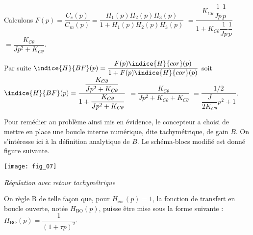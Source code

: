\begin{multicols}{2}

\ifprof
\begin{corrige}
Calculons $F(p) =\dfrac{C_e(p)}{C_m(p)} = \dfrac{H_1(p)H_2(p)H_3(p)}{1+H_1(p)H_2(p)H_3(p)}$
$= \dfrac{K_{C\theta}\dfrac{1}{Jp}\dfrac{1}{p}}{1+K_{C\theta}\dfrac{1}{Jp}\dfrac{1}{p}}$
$= \dfrac{K_{C\theta}}{Jp^2+K_{C\theta}}$.

Par suite $\indice{H}{BF}(p)=\dfrac{F(p) \indice{H}{cor}(p)}{1+F(p) \indice{H}{cor}(p)}$ soit
 $\indice{H}{BF}(p)= \dfrac{\dfrac{K_{C\theta}}{Jp^2+K_{C\theta}} }{1+\dfrac{K_{C\theta}}{Jp^2+K_{C\theta}} }$
$= \dfrac{K_{C\theta}}{Jp^2+K_{C\theta}+K_{C\theta} }$
$= \dfrac{1/2}{\dfrac{J}{2K_{C\theta}}p^2+1 }$.
\end{corrige}
\else
\fi

\ifprof
\begin{corrige}
\end{corrige}
\else
\fi

\vspace{.25cm}

Pour remédier au problème ainsi mis en évidence, le concepteur a choisi de mettre en place une boucle
interne numérique, dite tachymétrique, de gain $B$. On s’intéresse ici à la définition analytique de $B$.
Le schéma-blocs modifié est donné figure suivante.


\begin{center}
\texttt{[image: fig\_07]}

\textit{Régulation avec retour tachymétrique}
\end{center}


On règle B de telle façon que, pour $H_{\text{cor}}(p)=1$, la fonction de transfert en boucle ouverte, notée $H_{\text{BO}}(p)$, puisse être mise sous la forme suivante : 
$H_{\text{BO}}(p)=\dfrac{1}{\left(1+\tau p\right)^2}$.



\ifprof
\begin{corrige}
\end{corrige}
\else
\fi

\vspace{.25cm}


\end{multicols}
